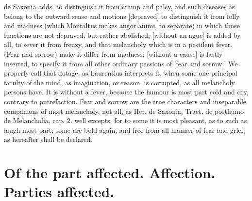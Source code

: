 {{de Saxonia adds, to distinguish it from cramp and palsy, and such
diseases as belong to the outward sense and motions [depraved] to
distinguish it from folly and madness (which Montaltus makes angor
animi, to separate) in which those functions are not depraved, but
rather abolished; [without an ague] is added by all, to sever it from
frenzy, and that melancholy which is in a pestilent fever. (Fear and
sorrow) make it differ from madness: [without a cause] is lastly
inserted, to specify it from all other ordinary passions of [fear and
sorrow.] We properly call that dotage, as Laurentius interprets
it, when some one principal faculty of the mind, as imagination, or
reason, is corrupted, as all melancholy persons have. It is without a
fever, because the humour is most part cold and dry, contrary to
putrefaction. Fear and sorrow are the true characters and inseparable
companions of most melancholy, not all, as Her. de Saxonia, Tract. de
posthumo de Melancholia, cap. 2. well excepts; for to some it is most
pleasant, as to such as laugh most part; some are bold again, and free
from all manner of fear and grief, as hereafter shall be declared.

\section{Of the part affected. Affection. Parties affected.}

}}
